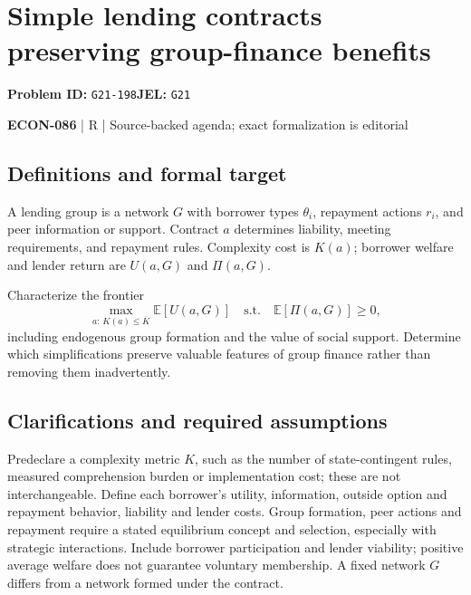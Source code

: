 \documentclass[11pt,a4paper]{article}
\begin{document}
\section*{Simple lending contracts preserving group-finance benefits}
\textbf{Problem ID:} \texttt{G21-198}\quad \textbf{JEL:} \texttt{G21}\par
\label{problem:OP-0647}


\label{audited:ECON-086}

{\sffamily\small\color{muted}\textbf{ECON-086} | R | Source-backed agenda; exact formalization is editorial\par}

\subsection*{Definitions and formal target}

A lending group is a network $G$ with borrower types $\theta_i$, repayment actions $r_i$, and peer information or support. Contract $a$ determines liability, meeting requirements, and repayment rules. Complexity cost is $K(a)$; borrower welfare and lender return are $U(a,G)$ and $\Pi(a,G)$.

Characterize the frontier
\[
 \max_{a:\,K(a)\leq\overline K}\mathbb E[U(a,G)]
 \quad\text{s.t.}\quad\mathbb E[\Pi(a,G)]\geq0,
\]
including endogenous group formation and the value of social support. Determine which simplifications preserve valuable features of group finance rather than removing them inadvertently.

\subsection*{Clarifications and required assumptions}

Predeclare a complexity metric \(K\), such as the number of state-contingent rules, measured comprehension burden or implementation cost; these are not interchangeable. Define each borrower's utility, information, outside option and repayment behavior, liability and lender costs. Group formation, peer actions and repayment require a stated equilibrium concept and selection, especially with strategic interactions. Include borrower participation and lender viability; positive average welfare does not guarantee voluntary membership. A fixed network \(G\) differs from a network formed under the contract.
\end{document}
